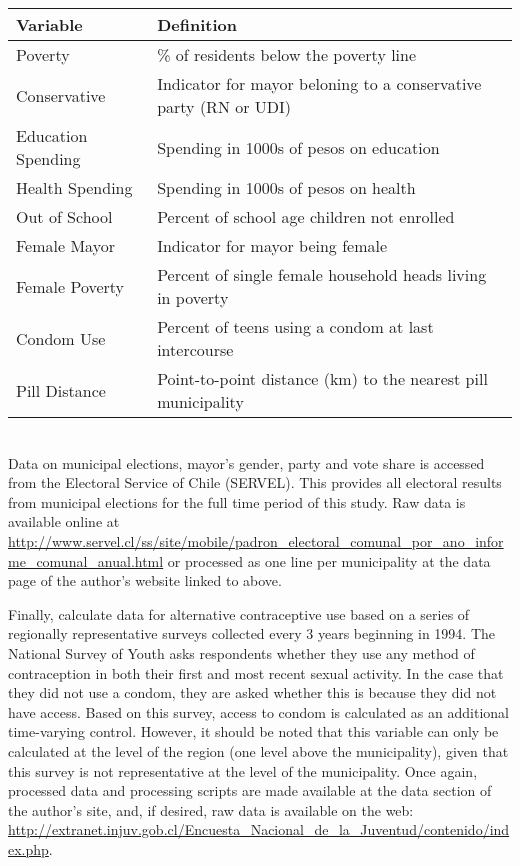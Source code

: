 \begin{spacing}{1.4}
\begin{tabular}{ll} \toprule
Variable & Definition \\ \midrule
Poverty & \% of residents below the poverty line \\
Conservative & Indicator for mayor beloning to a conservative party (RN or UDI)\\
Education Spending & Spending in 1000s of pesos on education \\
Health Spending & Spending in 1000s of pesos on health \\
Out of School & Percent of school age children not enrolled \\
Female Mayor & Indicator for mayor being female \\
Female Poverty & Percent of single female household heads living in poverty \\
Condom Use & Percent of teens using a condom at last intercourse \\
Pill Distance & Point-to-point distance (km) to the nearest pill municipality \\
\bottomrule
\end{tabular} 
\vspace{2mm} \\


Data on municipal elections, mayor's gender, party and vote share is accessed
from the Electoral Service of Chile (SERVEL).  This provides all electoral
results from municipal elections for the full time period of this study.  Raw
data is available online at 
\url{http://www.servel.cl/ss/site/mobile/padron_electoral_comunal_por_ano_informe_comunal_anual.html}
or processed as one line per municipality at the data page of the author's
website linked to above.

Finally, \person calculate data for alternative contraceptive use based on
a series of regionally representative surveys collected every 3 years beginning
in 1994.  The National Survey of Youth asks respondents whether they use any 
method of contraception in both their first and most recent sexual activity.  
In the case that they did not use a condom, they are asked whether this is 
because they did not have access.  Based on this survey, access to condom is
calculated as an additional time-varying control.  However, it should be noted
that this variable can only be calculated at the level of the region (one 
level above the municipality), given that this survey is not representative at 
the level of the municipality.  Once again, processed data and processing 
scripts are made available at the data section of the author's site, and, if 
desired, raw data is available on the web: 
\url{http://extranet.injuv.gob.cl/Encuesta_Nacional_de_la_Juventud/contenido/index.php}.


\end{spacing}
